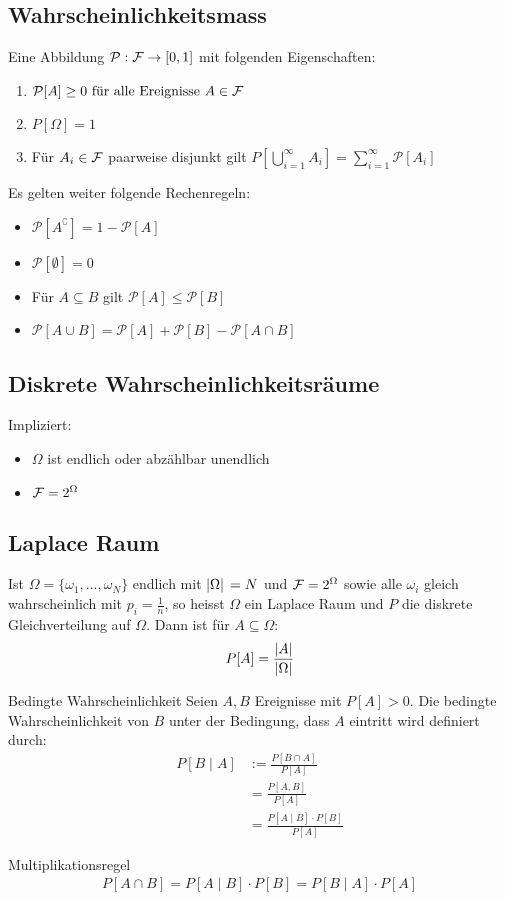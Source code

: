 \subsection{Wahrscheinlichkeitsmass}
Eine Abbildung $\mathcal{P}: \mathcal{F} \to [0, 1]$ mit folgenden Eigenschaften:
\begin{enumerate}[label= (\arabic*)]
  \item $\mathcal{P}[A] \geq 0 \text{ für alle Ereignisse } A \in \mathcal{F}$
  \item $P[\Omega] = 1$
  \item Für $A_i \in \mathcal{F}$ paarweise disjunkt gilt $P[\bigcup_{i = 1}^\infty A_i] =
          \sum_{i = 1}^\infty \mathcal{P}[A_i]$
\end{enumerate}
Es gelten weiter folgende Rechenregeln:
\begin{itemize}
  \item $\mathcal{P}[A^\complement] = 1 - \mathcal{P}[A]$
  \item $\mathcal{P}[\emptyset] = 0$
  \item Für $A \subseteq B$ gilt $\mathcal{P}[A] \leq \mathcal{P}[B]$
  \item $\mathcal{P}[A \cup B] = \mathcal{P}[A] + \mathcal{P}[B] - \mathcal{P}[A \cap B]$
\end{itemize}
\subsection{Diskrete Wahrscheinlichkeitsräume}
Impliziert:
\begin{itemize}
  \item $\Omega$ ist endlich oder abzählbar unendlich
  \item $\mathcal{F} = 2^{\Omega}$
\end{itemize}
\subsection{Laplace Raum}
Ist $\Omega = \{\omega_1, \dots, \omega_N\}$ endlich mit $\abs*{\Omega} = N$
und $\mathcal{F} = 2^\Omega$ sowie alle $\omega_i$ gleich wahrscheinlich mit $p_i =
  \frac{1}{n}$, so heisst $\Omega$ ein Laplace Raum und $P$ die diskrete
Gleichverteilung auf $\Omega$. Dann ist für $A \subseteq \Omega$:
\begin{align*}
  P[A] = \frac{\abs{A}}{\abs{\Omega}}
\end{align*}
\begin{definition}{Bedingte Wahrscheinlichkeit}
Seien $A, B$ Ereignisse mit $P[A] > 0$. Die bedingte Wahrscheinlichkeit von $B$
unter der Bedingung, dass $A$ eintritt wird definiert durch:
\begin{align*}
  P[B \;|\; A] & := \frac{P[B \cap A]}{P[A]} \\
               & = \frac{P[A, B]}{P[A]}\\
               & = \frac{P[A \;|\; B] \cdot P[B]}{P[A]}
\end{align*}
\end{definition}
\begin{definition}{Multiplikationsregel}
\begin{align*}
  P[A \cap B] = P[A \;|\; B] \cdot P[B] = P[B \;|\; A] \cdot P[A]
\end{align*}
\end{definition}
